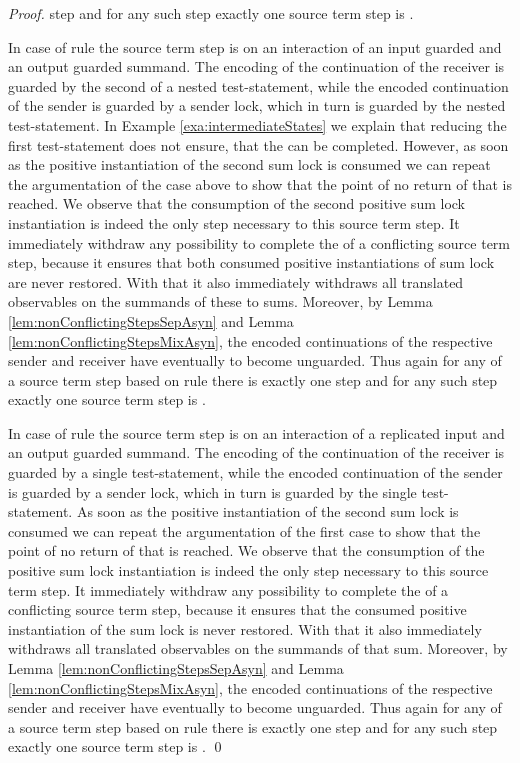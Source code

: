 \documentclass[]{llncs}
\begin{document}
\begin{proof}
\nonAdmin step and for any such \nonAdmin step exactly one source term step is \simulated.
	
	In case of rule  the source term step is on an interaction of an input guarded and an output guarded summand. The encoding of the continuation of the receiver is guarded by the second of a nested test-statement, while the encoded continuation of the sender is guarded by a sender lock, which in turn is guarded by the nested test-statement. In Example \ref{exa:intermediateStates} we explain that reducing the first test-statement does not ensure, that the \simulation can be completed. However, as soon as the positive instantiation of the second sum lock is consumed we can repeat the argumentation of the case above to show that the point of no return of that \simulation is reached. We observe that the consumption of the second positive sum lock instantiation is indeed the only \nonAdmin step necessary to \simulate this source term step. It immediately withdraw any possibility to complete the \simulation of a conflicting source term step, because it ensures that both consumed positive instantiations of sum lock are never restored. With that it also immediately withdraws all translated observables on the summands of these to sums. Moreover, by Lemma \ref{lem:nonConflictingStepsSepAsyn} and Lemma \ref{lem:nonConflictingStepsMixAsyn}, the encoded continuations of the respective sender and receiver have eventually to become unguarded. Thus again for any \simulation of a source term step based on rule  there is exactly one \nonAdmin step and for any such \nonAdmin step exactly one source term step is \simulated.
	
	In case of rule  the source term step is on an interaction of a replicated input and an output guarded summand. The encoding of the continuation of the receiver is guarded by a single test-statement, while the encoded continuation of the sender is guarded by a sender lock, which in turn is guarded by the single test-statement. As soon as the positive instantiation of the second sum lock is consumed we can repeat the argumentation of the first case to show that the point of no return of that \simulation is reached. We observe that the consumption of the positive sum lock instantiation is indeed the only \nonAdmin step necessary to \simulate this source term step. It immediately withdraw any possibility to complete the \simulation of a conflicting source term step, because it ensures that the consumed positive instantiation of the sum lock is never restored. With that it also immediately withdraws all translated observables on the summands of that sum. Moreover, by Lemma \ref{lem:nonConflictingStepsSepAsyn} and Lemma \ref{lem:nonConflictingStepsMixAsyn}, the encoded continuations of the respective sender and receiver have eventually to become unguarded. Thus again for any \simulation of a source term step based on rule  there is exactly one \nonAdmin step and for any such \nonAdmin step exactly one source term step is \simulated.
	\qed
\end{proof}
\end{document}
